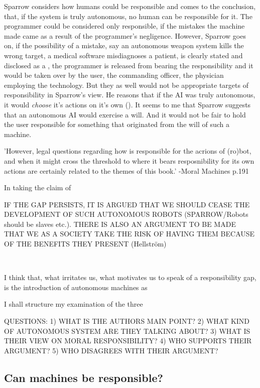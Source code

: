 \documentclass{article}
\begin{document}
Sparrow considers how humans could be responsible and comes to the conclusion,
that, if the system is truly autonomous, no human can be responsible for it. The
programmer could be considered only responsible, if the mistakes the machine
made came as a result of the programmer's negligence. However, Sparrow goes on,
if the possibility of a mistake, say an autonomous weapon system kills the wrong
target, a medical software misdiagnoses a patient, is clearly stated and
disclosed as a , the programmer is released from
bearing the responsibility and it would be taken over by the user, the
commanding officer, the physician employing the technology. But they as well would
not be appropriate targets of responsibility in Sparrow's view. He reasons that
if the AI was truly autonomous, it would \textit{choose} it's actions on it's
own (\cite[p. 70]{sparrow2007killer}). It seems to me that Sparrow suggests that
an autonomous AI would exercise a will. And it would not be fair to hold the
user responsible for something that originated from the will of such a machine.

'However, legal questions regarding how is responsible for the acrions of
(ro)bot, and when it might cross the threshold to where it bears resposnibility
for its own actions are certainly related to the themes of this book.' -Moral
Machines p.191

In taking the
claim of 

IF THE GAP PERSISTS, IT IS ARGUED THAT WE SHOULD CEASE THE DEVELOPMENT OF SUCH
AUTONOMOUS ROBOTS (SPARROW/Robots should be slaves etc.). THERE IS ALSO AN
ARGUMENT TO BE MADE THAT WE AS A SOCIETY TAKE THE RISK OF HAVING THEM BECAUSE OF
THE BENEFITS THEY PRESENT (Hellström)

~~~~~~~~~~~~~~~~~~~~~

I think that, what irritates us, what motivates us to speak of a responsibility
gap, is the introduction of autonomous machines as

I shall structure my examination of the three

QUESTIONS: 
1) WHAT IS THE AUTHORS MAIN POINT?
2) WHAT KIND OF AUTONOMOUS SYSTEM ARE THEY TALKING ABOUT?
3) WHAT IS THEIR VIEW ON MORAL RESPONSIBILITY?
4) WHO SUPPORTS THEIR ARGUMENT?
5) WHO DISAGREES WITH THEIR ARGUMENT?

\subsection{Can machines be responsible?}
\end{document}
